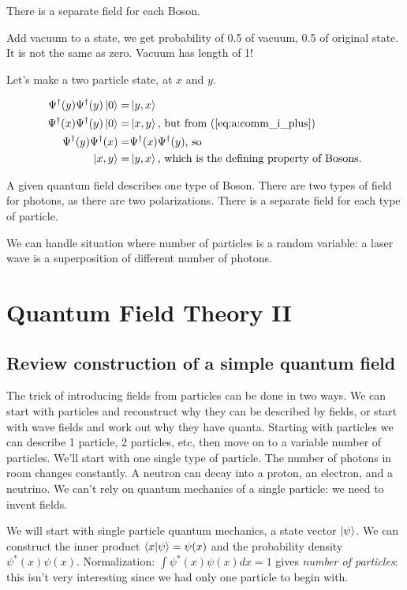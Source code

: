 \documentclass[]{article}
\begin{document}
There is a separate field for each Boson.

Add vacuum to a state, we get probability of 0.5 of vacuum, 0.5 of original state. It is not the same as zero. Vacuum has length of 1!

Let's make a two particle state, at $x$ and $y$. 
 
\begin{align*}
	\Psi^\dagger(y)\Psi^\dagger(y)\ket{0} =& \ket{y,x}\\
	\Psi^\dagger(x)\Psi^\dagger(y)\ket{0} =& \ket{x,y} \text{, but from (\ref {eq:a:comm_i_plus})}\\
	\Psi^\dagger(y)\Psi^\dagger(x) =& \Psi^\dagger(x)\Psi^\dagger(y) \text{, so}\\
	\ket{x,y} =& \ket{y,x} \text{, which is the defining property of Bosons.} 
\end{align*}

A given quantum field describes one type of Boson. There are two types of field for photons, as there are two polarizations. There is a separate field for each type of particle.

We can handle situation where number of particles is a random variable: a laser wave is a superposition of different number of photons.

\section{Quantum Field Theory II}

\subsection{Review construction of a simple quantum field}

The trick of introducing fields from particles can be done in two ways. We can start with particles and reconstruct why they can be described by fields, or start with wave fields and work out why they have quanta. Starting with particles we can describe 1 particle, 2 particles, etc, then move on to a variable number of particles. We'll start with one single type of particle. The number of photons in room changes constantly. A neutron can decay into a proton, an electron, and a neutrino. We can't rely on quantum mechanics of a single particle: we need to invent fields.

We will start with single particle quantum mechanics, a state vector $\ket{\psi}$. We can construct the inner product $\braket{x|\psi}=\psi(x)$ and the probability density $\psi^*(x) \psi(x)$.  Normalization: $\int \psi^*(x) \psi(x) dx=1$ gives \textit{number of particles}: this isn't very interesting since we had only one particle to begin with.
\end{document}
